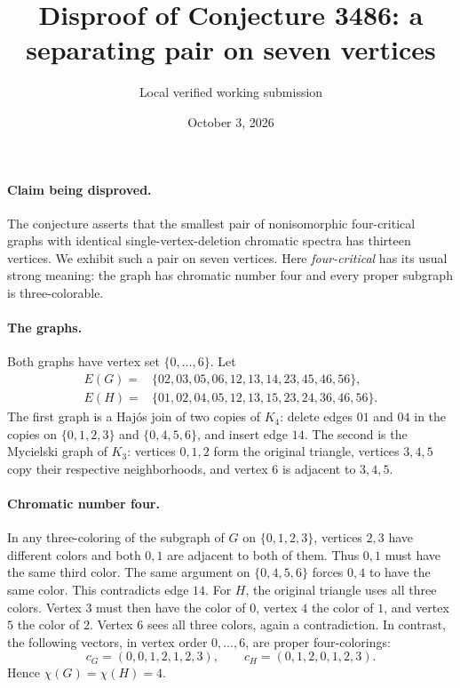 \documentclass[10pt]{article}
\title{Disproof of Conjecture 3486: a separating pair on seven vertices}
\author{Local verified working submission}
\date{October 3, 2026}
\makeatletter
\renewcommand{\maketitle}{\begin{center}
{\Large\bfseries\@title\par}\vspace{0.6em}
{\small\@author\par\@date}
\end{center}\vspace{0.5em}}
\makeatother
\begin{document}
\maketitle

\paragraph{Claim being disproved.}
The conjecture asserts that the smallest pair of nonisomorphic
four-critical graphs with identical single-vertex-deletion chromatic
spectra has thirteen vertices. We exhibit such a pair on seven vertices.
Here \emph{four-critical} has its usual strong meaning: the graph has
chromatic number four and every proper subgraph is three-colorable.

\paragraph{The graphs.}
Both graphs have vertex set $\{0,\ldots,6\}$. Let
\begin{align*}
E(G)={}&\{02,03,05,06,12,13,14,23,45,46,56\},\\
E(H)={}&\{01,02,04,05,12,13,15,23,24,36,46,56\}.
\end{align*}
The first graph is a Haj\'os join of two copies of $K_4$:
delete edges $01$ and $04$ in the copies on $\{0,1,2,3\}$
and $\{0,4,5,6\}$, and insert edge $14$.
The second is the Mycielski graph of $K_3$: vertices $0,1,2$ form
the original triangle, vertices $3,4,5$ copy their respective
neighborhoods, and vertex $6$ is adjacent to $3,4,5$.

\paragraph{Chromatic number four.}
In any three-coloring of the subgraph of $G$ on $\{0,1,2,3\}$,
vertices $2,3$ have different colors and both $0,1$ are adjacent
to both of them. Thus $0,1$ must have the same third color.
The same argument on $\{0,4,5,6\}$ forces $0,4$ to have the same
color. This contradicts edge $14$.
For $H$, the original triangle uses all three colors.
Vertex $3$ must then have the color of $0$, vertex $4$ the color
of $1$, and vertex $5$ the color of $2$. Vertex $6$ sees all three
colors, again a contradiction.
In contrast, the following vectors, in vertex order $0,\ldots,6$,
are proper four-colorings:
\[
 c_G=(0,0,1,2,1,2,3),\qquad
 c_H=(0,1,2,0,1,2,3).
\]
Hence $\chi(G)=\chi(H)=4$.
\end{document}
